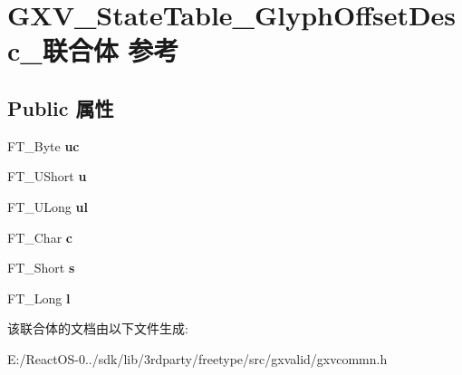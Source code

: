 \hypertarget{union_g_x_v___state_table___glyph_offset_desc__}{}\section{G\+X\+V\+\_\+\+State\+Table\+\_\+\+Glyph\+Offset\+Desc\+\_\+联合体 参考}
\label{union_g_x_v___state_table___glyph_offset_desc__}
\subsection*{Public 属性}
\begin{DoxyCompactItemize}
\item 
\mbox{\label{union_g_x_v___state_table___glyph_offset_desc___a36bb2ee89327d873cf8cabdf6ecccac2}} 
F\+T\+\_\+\+Byte {\bfseries uc}
\item 
\mbox{\label{union_g_x_v___state_table___glyph_offset_desc___ac2a262ca15d7f24b04024756062c9bdb}} 
F\+T\+\_\+\+U\+Short {\bfseries u}
\item 
\mbox{\label{union_g_x_v___state_table___glyph_offset_desc___ae11eda9897da9cba00f0c992d4157fb7}} 
F\+T\+\_\+\+U\+Long {\bfseries ul}
\item 
\mbox{\label{union_g_x_v___state_table___glyph_offset_desc___a98232fa40ff99e63b85cedd84241709f}} 
F\+T\+\_\+\+Char {\bfseries c}
\item 
\mbox{\label{union_g_x_v___state_table___glyph_offset_desc___ae95326a3bf51d1747e21fb5bc9e9ddeb}} 
F\+T\+\_\+\+Short {\bfseries s}
\item 
\mbox{\label{union_g_x_v___state_table___glyph_offset_desc___af30fd6d6bc498920936734b131a4ef45}} 
F\+T\+\_\+\+Long {\bfseries l}
\end{DoxyCompactItemize}


该联合体的文档由以下文件生成\+:\begin{DoxyCompactItemize}
\item 
E\+:/\+React\+O\+S-\/0../sdk/lib/3rdparty/freetype/src/gxvalid/gxvcommn.\+h\end{DoxyCompactItemize}
